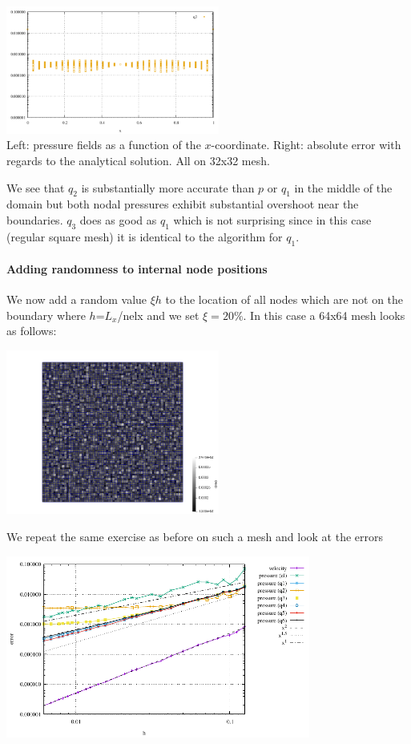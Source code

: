 \begin{center}
\includegraphics[width=7cm]{python_codes/fieldstone_12/results/reg/q3_error}\\
{\captionfont Left: pressure fields as a function of the $x$-coordinate. 
Right: absolute error with regards to the analytical solution. All on 32x32 mesh.}
\end{center}
We see that $q_2$ is substantially more accurate than $p$ or $q_1$ in the middle of the domain but both nodal 
pressures exhibit substantial overshoot near the boundaries. $q_3$  does as good as $q_1$ which is not 
surprising since in this case (regular square mesh) it is identical to the algorithm for $q_1$.


\paragraph{Adding randomness to internal node positions} We now add a random value $\xi h$ to the 
location of all nodes which are not on the boundary where $h$=$L_x$/nelx and we set $\xi=20\%$.
In this case a 64x64 mesh looks as follows:

\begin{center}
\includegraphics[width=7cm]{python_codes/fieldstone_12/results/rand/grid}
\end{center}

We repeat the same exercise as before on such a mesh and look at the errors

\begin{center}
\includegraphics[width=10cm]{python_codes/fieldstone_12/results/rand/errors}
\end{center}

